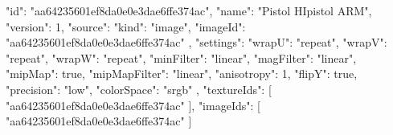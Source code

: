 {
  "id": "aa64235601ef8da0e0e3dae6ffe374ac",
  "name": "Pistol HIpistol ARM",
  "version": 1,
  "source": {
    "kind": "image",
    "imageId": "aa64235601ef8da0e0e3dae6ffe374ac"
  },
  "settings": {
    "wrapU": "repeat",
    "wrapV": "repeat",
    "wrapW": "repeat",
    "minFilter": "linear",
    "magFilter": "linear",
    "mipMap": true,
    "mipMapFilter": "linear",
    "anisotropy": 1,
    "flipY": true,
    "precision": "low",
    "colorSpace": "srgb"
  },
  "textureIds": [
    "aa64235601ef8da0e0e3dae6ffe374ac"
  ],
  "imageIds": [
    "aa64235601ef8da0e0e3dae6ffe374ac"
  ]
}
